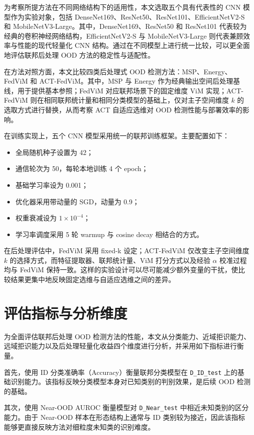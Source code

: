 为考察所提方法在不同网络结构下的适用性，本文选取五个具有代表性的 CNN 模型作为实验对象，包括 DenseNet169、ResNet50、ResNet101、EfficientNetV2-S 和 MobileNetV3-Large。其中，DenseNet169、ResNet50 和 ResNet101 代表较为经典的卷积神经网络结构，EfficientNetV2-S 与 MobileNetV3-Large 则代表兼顾效率与性能的现代轻量化 CNN 结构。通过在不同模型上进行统一比较，可以更全面地评估联邦后处理 OOD 方法的稳定性与适配性。

在方法对照方面，本文比较四类后处理式 OOD 检测方法：MSP、Energy、FedViM 和 ACT-FedViM。其中，MSP 与 Energy 作为经典输出空间后处理基线，用于提供基本参照；FedViM 对应联邦场景下的固定维度 ViM 实现；ACT-FedViM 则在相同联邦统计量和相同分类模型的基础上，仅对主子空间维度 $k$ 的选取方式进行替换，从而考察 ACT 自适应选维对 OOD 检测性能与部署效率的影响。

在训练实现上，五个 CNN 模型采用统一的联邦训练框架。主要配置如下：
\begin{itemize}
  \item 全局随机种子设置为 42；
  \item 通信轮次为 50，每轮本地训练 4 个 epoch；
  \item 基础学习率设为 0.001；
  \item 优化器采用带动量的 SGD，动量为 0.9；
  \item 权重衰减设为 $1\times 10^{-4}$；
  \item 学习率调度采用 5 轮 warmup 与 cosine decay 相结合的方式。
\end{itemize}

在后处理评估中，FedViM 采用 fixed-k 设定；ACT-FedViM 仅改变主子空间维度 $k$ 的选择方式，而特征提取器、联邦统计量、ViM 打分方式以及经验 $\alpha$ 校准过程均与 FedViM 保持一致。这样的实验设计可以尽可能减少额外变量的干扰，使比较结果更集中地反映固定选维与自适应选维之间的差异。

\section{评估指标与分析维度}

为全面评估联邦后处理 OOD 检测方法的性能，本文从分类能力、近域拒识能力、远域拒识能力以及后处理轻量化收益四个维度进行分析，并采用如下指标进行衡量。

首先，使用 ID 分类准确率（Accuracy）衡量联邦分类模型在 \texttt{D\_ID\_test} 上的基础识别能力。该指标反映分类模型本身对已知类别的判别效果，是后续 OOD 检测的基础。

其次，使用 Near-OOD AUROC 衡量模型对 \texttt{D\_Near\_test} 中相近未知类别的区分能力。由于 Near-OOD 样本在形态结构上通常与 ID 类别较为接近，因此该指标能够更直接反映方法对细粒度未知类的识别难度。

